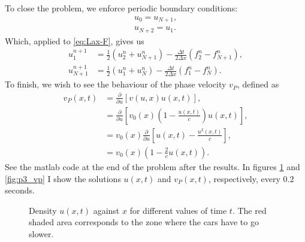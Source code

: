 \begin{questions}
\begin{solution}
To close the problem, we enforce periodic boundary conditions:
\begin{align*}
u_0 = u_{N+1},\\
u_{N+2} = u_1.
\end{align*}
Which, applied to \eqref{eq:Lax-F}, gives us
\begin{align}\label{eq:Lax-F}
u_1^{n+1} &= \frac{1}{2}\left(u_{2}^n+u_{N+1}^n\right)-\frac{\Delta t}{2\Delta x}\left(f_{2}^n-f_{N+1}^n\right),\\
u_{N+1}^{n+1} &= \frac{1}{2}\left(u_{1}^n+u_{N}^n\right)-\frac{\Delta t}{2\Delta x}\left(f_{1}^n-f_{N}^n\right).
\end{align}
To finish, we wish to see the behaviour of the phase velocity $v_P$, defined as
\begin{align}
v_P(x,t) &= \frac{\partial}{\partial u}\left[v(u,x)u(x,t)\right],\\
&= \frac{\partial}{\partial u}\left[v_0(x)\left(1 - \frac{u(x,t)}{c}\right)
u(x,t)\right],\\
&= v_0(x)\frac{\partial}{\partial u}\left[u(x,t) - \frac{u^2(x,t)}{c}\right],\\
&= v_0(x)\left(1 - \frac{2}{c}u(x,t)\right).
\end{align}
See the matlab code at the end of the problem after the results. In figures \ref{fig:p3_u} and \ref{fig:p3_vp} I show the solutions $u(x,t)$ and $v_P(x,t)$, respectively, every $0.2$ seconds.


\newpage
\begin{figure}[H]\label{fig:p3_u}
\centering     %
{}
\hspace{-0.9cm}
\hspace{-0.9cm}
\hspace{-0.9cm}
\hspace{-0.9cm}
\hspace{-0.9cm}
\hspace{-0.9cm}
\caption{Density $u(x,t)$ against $x$ for different values of time $t$. The red shaded area corresponds to the zone where the cars have to go slower.} 
\end{figure}


\end{solution}
\end{questions}
